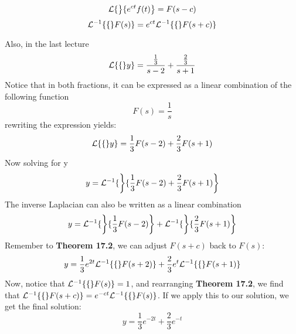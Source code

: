 \documentclass[diffeq.tex]{subfiles}
\begin{document}
    \begin{btheorem}
        \begin{equation}
            \mathcal{L}\{\left\}\{e^{ct}f(t)\right\} = F(s - c)
        \end{equation}
        \begin{equation}
            \mathcal{L}^{-1}\{\{\}F(s)\} = e^{ct}\mathcal{L}^{-1}\{\{\}F(s + c)\}
        \end{equation}
    \end{btheorem}\np
    Also, in the last lecture
    \begin{equation}
        \mathcal{L}\{\{\}y\} = \frac{\frac{1}{3}}{s - 2} + \frac{\frac{2}{3}}{s + 1}
    \end{equation}
    Notice that in both fractions, it can be expressed as a linear combination of the following function
    \begin{equation}
        F(s) = \frac{1}{s}
    \end{equation}
    rewriting the expression yields:
    \begin{equation}
        \mathcal{L}\{\{\}y\} = \frac{1}{3}F(s - 2) + \frac{2}{3}F(s + 1)
    \end{equation}
    Now solving for y
    \begin{equation}
        y = \mathcal{L}^{-1}\{\left\}\{\frac{1}{3}F(s - 2) + \frac{2}{3}F(s + 1)\right\}
    \end{equation}
    The inverse Laplacian can also be written as a linear combination
    \begin{equation}
        y = \mathcal{L}^{-1}\{\left\}\{\frac{1}{3}F(s - 2)\right\} + \mathcal{L}^{-1}\{\left\}\{\frac{2}{3}F(s + 1)\right\}
    \end{equation}
    Remember to \textbf{Theorem 17.2}, we can adjust $F(s + c)$ back to $F(s)$:
    \begin{equation}
        y = \frac{1}{3}e^{2t}\mathcal{L}^{-1}\{\{\}F(s + 2)\} + \frac{2}{3}e^{t}\mathcal{L}^{-1}\{\{\}F(s + 1)\}
    \end{equation}
    Now, notice that $\mathcal{L}^{-1}\{\{\}F(s)\} = 1$, and rearranging \textbf{Theorem 17.2}, we find that $\mathcal{L}^{-1}\{\{\}F(s + c)\} = e^{-ct}\mathcal{L}^{-1}\{\{\}F(s)\}$. If we apply this to our solution, we get the final solution:
    \begin{equation}
        y = \frac{1}{3}e^{-2t}+\frac{2}{3}e^{-t}
    \end{equation}
\end{document}
